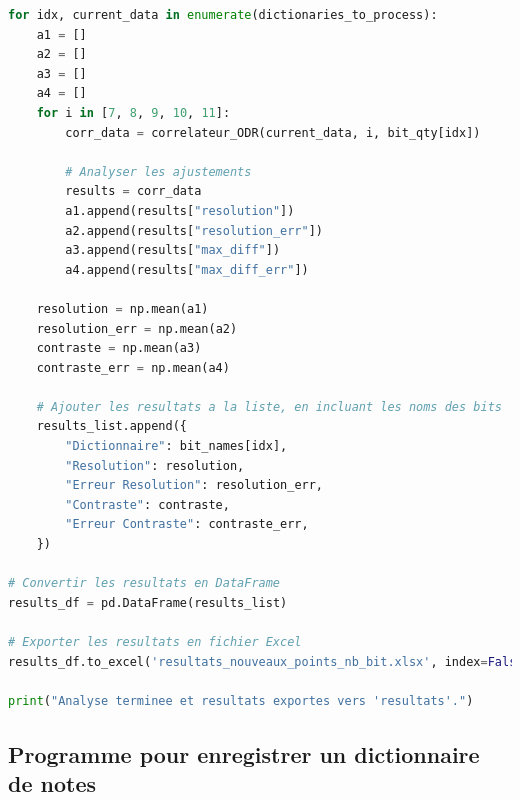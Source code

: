 ﻿\documentclass[11pt,letterpaper]{article}
\begin{document}
\begin{lstlisting}[language=python]
for idx, current_data in enumerate(dictionaries_to_process):
    a1 = []
    a2 = []
    a3 = []
    a4 = []
    for i in [7, 8, 9, 10, 11]:
        corr_data = correlateur_ODR(current_data, i, bit_qty[idx])

        # Analyser les ajustements
        results = corr_data
        a1.append(results["resolution"])
        a2.append(results["resolution_err"])
        a3.append(results["max_diff"])
        a4.append(results["max_diff_err"])

    resolution = np.mean(a1)
    resolution_err = np.mean(a2)
    contraste = np.mean(a3)
    contraste_err = np.mean(a4)

    # Ajouter les resultats a la liste, en incluant les noms des bits
    results_list.append({
        "Dictionnaire": bit_names[idx],
        "Resolution": resolution,
        "Erreur Resolution": resolution_err,
        "Contraste": contraste,
        "Erreur Contraste": contraste_err,
    })

# Convertir les resultats en DataFrame
results_df = pd.DataFrame(results_list)

# Exporter les resultats en fichier Excel
results_df.to_excel('resultats_nouveaux_points_nb_bit.xlsx', index=False)

print("Analyse terminee et resultats exportes vers 'resultats'.")
\end{lstlisting}

\subsection{Programme pour enregistrer un dictionnaire de notes}
\end{document}
